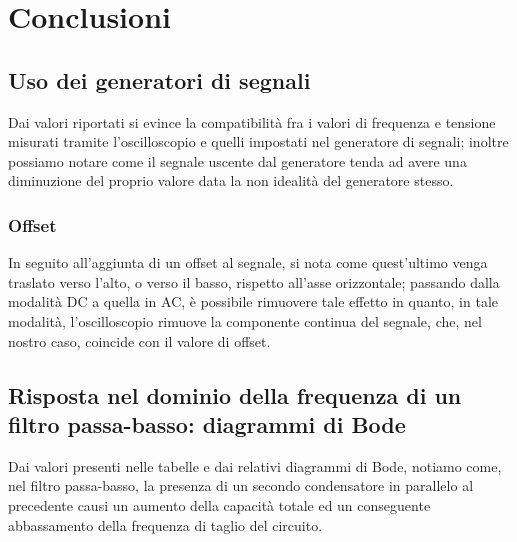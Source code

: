 \documentclass{article}
\begin{document}
	\section{Conclusioni}
		\subsection{Uso dei generatori di segnali}
			Dai valori riportati si evince la compatibilità fra i valori di frequenza e tensione misurati tramite l'oscilloscopio e quelli impostati nel generatore di segnali; inoltre possiamo notare come il segnale uscente dal generatore tenda ad avere una diminuzione del proprio valore data la non idealità del generatore stesso.
			\subsubsection{Offset}
				In seguito all’aggiunta di un offset al segnale, si nota come quest’ultimo venga traslato verso l’alto, o verso il basso, rispetto all’asse orizzontale; passando dalla modalità DC a quella in AC, è possibile rimuovere tale effetto in quanto, in tale modalità, l’oscilloscopio rimuove la componente continua del segnale, che, nel nostro caso, coincide con il valore di offset.
		\subsection{Risposta nel dominio della frequenza di un filtro passa-basso: diagrammi di Bode}
			Dai valori presenti nelle tabelle e dai relativi diagrammi di Bode, notiamo come, nel filtro passa-basso, la presenza di un secondo condensatore in parallelo al precedente causi un aumento della capacità totale ed un conseguente abbassamento della frequenza di taglio del circuito.
\end{document}
